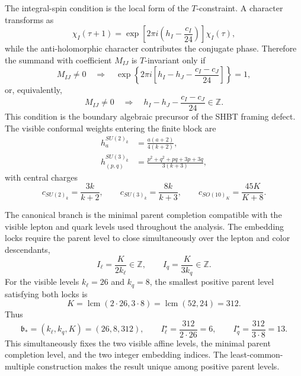 \documentclass[11pt,letterpaper]{article}
\theoremstyle{plain}
\newcommand{\branchstar}{\mathfrak b_*}
\newcommand{\kell}{k_{\ell}}
\newcommand{\kq}{k_q}
\newcommand{\Kpar}{K}
\begin{document}
The integral-spin condition is the local form of the $T$-constraint.  A
character transforms as
\begin{equation}
\label{eq:character-t-transform}
 \chi_I(\tau+1)
 =
 \exp\!\left[2\pi i\left(h_I-\frac{c_I}{24}\right)\right]
 \chi_I(\tau),
\end{equation}
while the anti-holomorphic character contributes the conjugate phase.  Therefore
the summand with coefficient $M_{IJ}$ is $T$-invariant only if
\begin{equation}
\label{eq:section-two-integral-spin}
 M_{IJ}\ne0
 \quad\Longrightarrow\quad
 \exp\!\left\{2\pi i\left[
 h_I-h_J-\frac{c_I-c_J}{24}
 \right]\right\}=1,
\end{equation}
or, equivalently,
\begin{equation}
\label{eq:section-two-integral-spin-integer}
 \boxed{
 M_{IJ}\ne0
 \quad\Longrightarrow\quad
 h_I-h_J-\frac{c_I-c_J}{24}\in\mathbb Z.}
\end{equation}
This condition is the boundary algebraic precursor of the SHBT framing defect.
The visible conformal weights entering the finite block are
\begin{align}
\label{eq:section-two-visible-weights}
 h^{SU(2)_k}_a
 &=
 \frac{a(a+2)}{4(k+2)},\nonumber\\
 h^{SU(3)_k}_{(p,q)}
 &=
 \frac{p^2+q^2+pq+3p+3q}{3(k+3)},
\end{align}
with central charges
\begin{equation}
\label{eq:section-two-visible-central-charges}
 c_{SU(2)_k}=\frac{3k}{k+2},
 \qquad
 c_{SU(3)_k}=\frac{8k}{k+3},
 \qquad
 c_{SO(10)_K}=\frac{45K}{K+8}.
\end{equation}

The canonical branch is the minimal parent completion compatible with the
visible lepton and quark levels used throughout the analysis.  The embedding locks
require the parent level to close simultaneously over the lepton and color
descendants,
\begin{equation}
\label{eq:integer-parent-locks}
 I_{\ell}=\frac{\Kpar}{2\kell}\in\mathbb Z,
 \qquad
 I_q=\frac{\Kpar}{3\kq}\in\mathbb Z.
\end{equation}
For the visible levels $\kell=26$ and $\kq=8$, the smallest positive parent
level satisfying both locks is
\begin{equation}
\label{eq:canonical-parent-lcm}
 \Kpar
 =
 \operatorname{lcm}(2\cdot26,3\cdot8)
 =
 \operatorname{lcm}(52,24)
 =312.
\end{equation}
Thus
\begin{equation}
\label{eq:section-two-benchmark-branch}
 \branchstar=(\kell,\kq,\Kpar)=(26,8,312),
 \qquad
 I_{\ell}^{\star}=\frac{312}{2\cdot26}=6,
 \qquad
 I_q^{\star}=\frac{312}{3\cdot8}=13.
\end{equation}
This simultaneously fixes the two visible affine levels, the minimal parent
completion level, and the two integer embedding indices.  The least-common-
multiple construction makes the result unique among positive parent levels.
\end{document}

